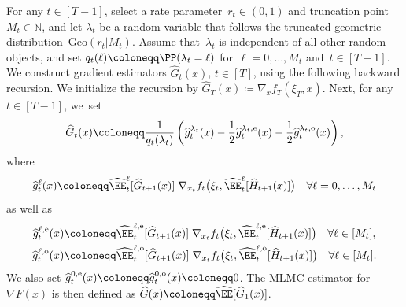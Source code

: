 \documentclass[11pt]{article}
\let\hat\widehat
\begin{document}
\begin{defn}
\label{def:rumlmc-grad}
For any $t\in[T-1]$, select a rate parameter~$r_t \in (0,1)$ and truncation point $M_t\in\mathbb N$, and let $\lambda_t$ be a random variable that follows the truncated geometric distribution~$\mathrm{Geo}(r_t | M_t)$. Assume that~$\lambda_t$ is independent of all other random objects, and set $q_t(\ell)\coloneqq\PP(\lambda_t=\ell)$ for~$\ell=0,\ldots,M_t$ and~$t\in[T-1]$. We construct gradient estimators $\hat G_t(x)$, $t\in[T]$, using the following backward recursion. We initialize the recursion by $\hat G_T(x)\coloneqq\nabla_x f_T(\xi_T,x)$. Next, for any $t\in[T-1]$, we~set
\begin{align}
    \hat{G}_t(x) \coloneqq \frac{1}{q_{t}(\lambda_{t})}\left( \hat{g}_t^{\lambda_t}(x)-\frac{1}{2}\hat{g}_t^{\lambda_t, {\rm e}}(x)-\frac{1}{2}\hat{g}_t^{\lambda_t, {\rm o}}(x)\label{eq:G_hat}\right),
\end{align}
where
\begin{equation*}
    \hat{g}_t^{\ell}(x) \coloneqq \hat\EE_t^{\ell}[\hat{G}_{t+1}(x) ]\; \nabla_{x_t} f_t \big(\xi_t, \hat\EE_t^{\ell}[ \hat{H}_{t+1}(x)] \big)\quad \forall \ell=0,\ldots,M_t
\end{equation*}
as well as
\begin{equation*}
\begin{aligned}
     \hat{g}_t^{\ell, {\rm e}}(x) \coloneqq& \hat\EE_t^{\ell, {\rm e}}[ \hat{G}_{t+1}(x)] \; \nabla_{x_t} f_t \big(\xi_t, \hat\EE_t^{\ell, {\rm e}}[\hat{H}_{t+1}(x)] \big)\quad \forall \ell\in[M_t], \\
     \hat{g}_t^{\ell, {\rm o}}(x) \coloneqq& \hat\EE_t^{\ell, {\rm o}}[ \hat{G}_{t+1}(x)] \; \nabla_{x_t} f_t \big(\xi_t, \hat\EE_t^{\ell, {\rm o}}[\hat{H}_{t+1}(x)] \big)\quad \forall \ell\in[M_t].
\end{aligned}
\end{equation*}
We also set $\hat{g}_t^{0,{\rm e}}(x)\coloneqq\hat{g}_t^{0,{\rm o}}(x)\coloneqq0$. The MLMC estimator for $\nabla F(x)$ is then defined as $ \hat G(x)\coloneqq\hat\EE [\hat{G}_{1}(x)]$. 
\end{defn}
\end{document}
